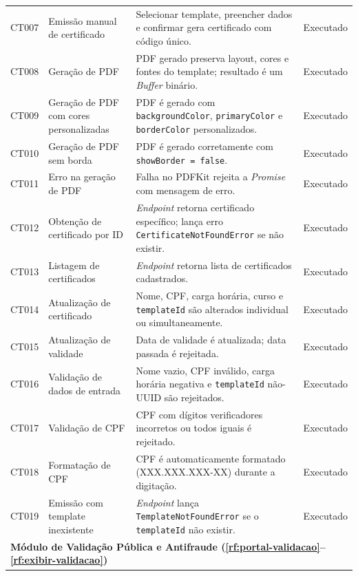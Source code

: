 \begin{longtable}{p{1.2cm} p{4.2cm} p{7.5cm} p{2.6cm}}
CT007 & Emissão manual de certificado & Selecionar template, preencher dados e confirmar gera certificado com código único. & Executado \\
CT008 & Geração de PDF & PDF gerado preserva layout, cores e fontes do template; resultado é um \textit{Buffer} binário. & Executado \\
CT009 & Geração de PDF com cores personalizadas & PDF é gerado com \texttt{backgroundColor}, \texttt{primaryColor} e \texttt{borderColor} personalizados. & Executado \\
CT010 & Geração de PDF sem borda & PDF é gerado corretamente com \texttt{showBorder = false}. & Executado \\
CT011 & Erro na geração de PDF & Falha no PDFKit rejeita a \textit{Promise} com mensagem de erro. & Executado \\
CT012 & Obtenção de certificado por ID & \textit{Endpoint} retorna certificado específico; lança erro \texttt{CertificateNotFoundError} se não existir. & Executado \\
CT013 & Listagem de certificados & \textit{Endpoint} retorna lista de certificados cadastrados. & Executado \\
CT014 & Atualização de certificado & Nome, CPF, carga horária, curso e \texttt{templateId} são alterados individual ou simultaneamente. & Executado \\
CT015 & Atualização de validade & Data de validade é atualizada; data passada é rejeitada. & Executado \\
CT016 & Validação de dados de entrada & Nome vazio, CPF inválido, carga horária negativa e \texttt{templateId} não-UUID são rejeitados. & Executado \\
CT017 & Validação de CPF & CPF com dígitos verificadores incorretos ou todos iguais é rejeitado. & Executado \\
CT018 & Formatação de CPF & CPF é automaticamente formatado (XXX.XXX.XXX-XX) durante a digitação. & Executado \\
CT019 & Emissão com template inexistente & \textit{Endpoint} lança \texttt{TemplateNotFoundError} se o \texttt{templateId} não existir. & Executado \\

\midrule
\multicolumn{4}{l}{\textbf{Módulo de Validação Pública e Antifraude (\ref{rf:portal-validacao}--\ref{rf:exibir-validacao})}} \\
\midrule


\end{longtable}
